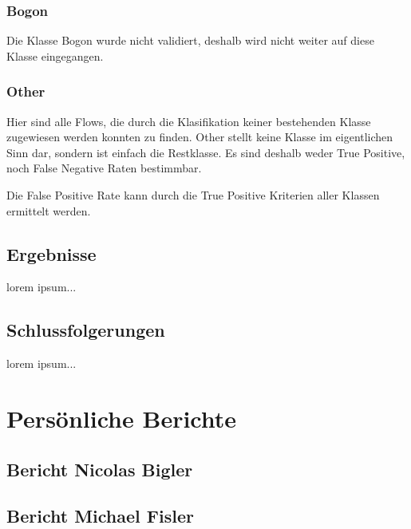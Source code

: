 \documentclass[a4paper]{scrartcl}
\begin{document}
\subsubsection{Bogon}
Die Klasse Bogon wurde nicht validiert, deshalb wird nicht weiter auf diese Klasse eingegangen.

\subsubsection{Other}
Hier sind alle Flows, die durch die Klasifikation keiner bestehenden Klasse zugewiesen werden konnten zu finden. Other stellt keine Klasse im eigentlichen Sinn dar, sondern ist einfach die Restklasse. Es sind deshalb weder True Positive, noch False Negative Raten bestimmbar.

Die False Positive Rate kann durch die True Positive Kriterien aller Klassen ermittelt werden.


\subsection{Ergebnisse}
lorem ipsum...
\subsection{Schlussfolgerungen}
lorem ipsum...

\section{Persönliche Berichte}
\subsection{Bericht Nicolas Bigler}
\subsection{Bericht Michael Fisler}

\end{document}
